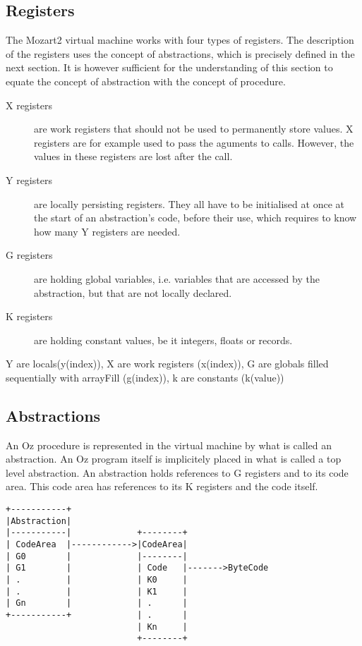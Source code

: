 \documentclass[a4paper]{memoir}
\begin{document}
\subsection{Registers}
The Mozart2 virtual machine works with four types of registers. The description of the registers uses the concept of abstractions, which is precisely defined in the next section. It is however sufficient for the understanding of this section to equate the concept of abstraction with the concept of procedure.
\begin{description}
  \item[X registers]are work registers that should not be used to permanently store values. X registers are for example used to pass the aguments to calls. However, the values in these registers are lost after the call. %
  \item[Y registers]are locally persisting registers. They all have to be initialised at once at the start of an abstraction's code, before their use, which requires to know how many Y registers are needed.
  \item[G registers] are holding global variables, i.e. variables that are accessed by the abstraction, but that are not locally declared.
  \item[K registers] are holding constant values, be it integers, floats or records.
\end{description}

Y are locals(y(index)), X are work registers (x(index)), G are globals filled sequentially with arrayFill (g(index)), k are constants (k(value))
\subsection{Abstractions}\label{sec:vm:abstractions}
An Oz procedure is represented in the virtual machine by what is called an abstraction. An Oz program itself is implicitely placed in what is called a top level abstraction.
An abstraction holds references to G registers and to its code area. This code area has references to its K registers and the code itself. 
\begin{verbatim}
+-----------+
|Abstraction|
|-----------|             +--------+
| CodeArea  |------------>|CodeArea|
| G0        |             |--------|
| G1        |             | Code   |------->ByteCode
| .         |             | K0     |
| .         |             | K1     |
| Gn        |             | .      |
+-----------+             | .      |
                          | Kn     |
                          +--------+
\end{verbatim}
\end{document}
